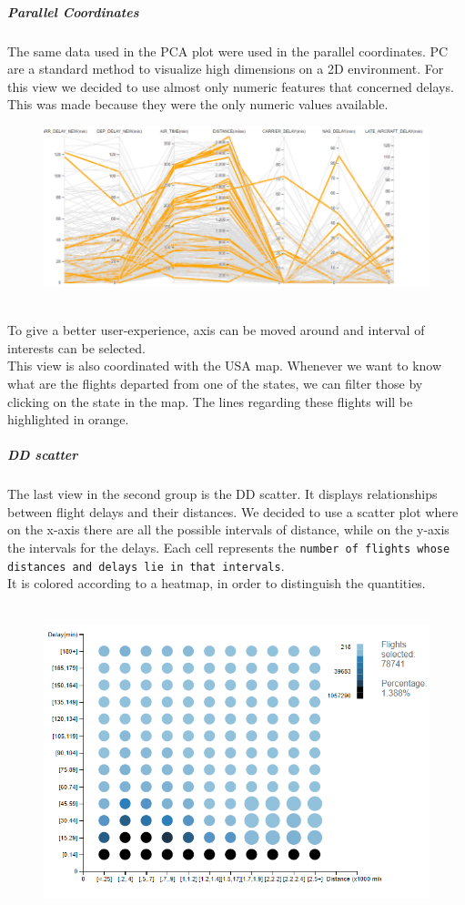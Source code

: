 \documentclass[a4paper, 12pt]{article}
\begin{document}
\subparagraph{Parallel Coordinates}The same data used in the PCA plot were used in the parallel coordinates. PC are a standard method to visualize high dimensions on a 2D environment. For this view we decided to use almost only numeric features that concerned delays. This was made because they were the only numeric values available.\\
\begin{figure}[h]	
\centering
\includegraphics[scale=0.7]{pc.PNG}
\end{figure}\\
To give a better user-experience, axis can be moved around and interval of interests can be selected.\\
This view is also coordinated with the USA map. Whenever we want to know what are the flights departed from one of the states, we can filter those by clicking on the state in the map. The lines regarding these flights will be highlighted in orange.
\subparagraph{DD scatter} The last view in the second group is the DD scatter. It displays relationships between flight delays and their distances.
We decided to use a scatter plot where on the x-axis there are all the possible intervals of distance, while on the y-axis the intervals for the delays. Each cell represents the \texttt{number of flights whose distances and delays lie in that intervals}.\\
It is colored according to a heatmap, in order to distinguish the quantities.\\ \\
\begin{figure}[h]	
\centering
\includegraphics[scale=0.7]{ddscat.PNG}
\end{figure}\\
\end{document}
